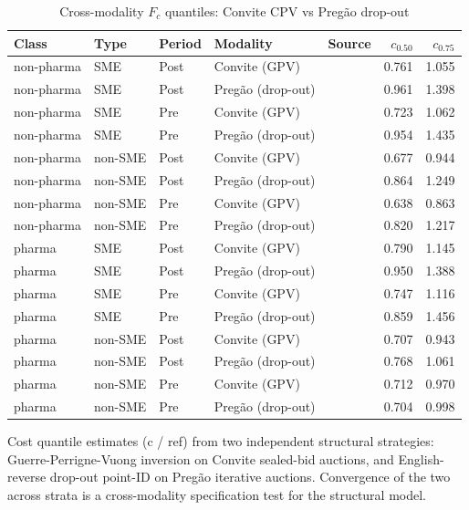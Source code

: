 \begin{table}[htbp]
\centering
\begin{threeparttable}
\caption{Cross-modality $F_c$ quantiles: Convite CPV vs Preg\~ao drop-out}
\label{tab:v3_cross_modality}
\small
\begin{tabular}{lllll rr}
\toprule
Class & Type & Period & Modality & Source & $c_{0.50}$ & $c_{0.75}$ \\
\midrule
non-pharma & SME & Post & Convite (GPV) & & 0.761 & 1.055 \\
non-pharma & SME & Post & Pregão (drop-out) & & 0.961 & 1.398 \\
non-pharma & SME & Pre & Convite (GPV) & & 0.723 & 1.062 \\
non-pharma & SME & Pre & Pregão (drop-out) & & 0.954 & 1.435 \\
non-pharma & non-SME & Post & Convite (GPV) & & 0.677 & 0.944 \\
non-pharma & non-SME & Post & Pregão (drop-out) & & 0.864 & 1.249 \\
non-pharma & non-SME & Pre & Convite (GPV) & & 0.638 & 0.863 \\
non-pharma & non-SME & Pre & Pregão (drop-out) & & 0.820 & 1.217 \\
pharma & SME & Post & Convite (GPV) & & 0.790 & 1.145 \\
pharma & SME & Post & Pregão (drop-out) & & 0.950 & 1.388 \\
pharma & SME & Pre & Convite (GPV) & & 0.747 & 1.116 \\
pharma & SME & Pre & Pregão (drop-out) & & 0.859 & 1.456 \\
pharma & non-SME & Post & Convite (GPV) & & 0.707 & 0.943 \\
pharma & non-SME & Post & Pregão (drop-out) & & 0.768 & 1.061 \\
pharma & non-SME & Pre & Convite (GPV) & & 0.712 & 0.970 \\
pharma & non-SME & Pre & Pregão (drop-out) & & 0.704 & 0.998 \\
\bottomrule
\end{tabular}
\begin{tablenotes}\footnotesize
\item Cost quantile estimates (c / ref) from two independent
structural strategies: Guerre-Perrigne-Vuong inversion on
Convite sealed-bid auctions, and English-reverse drop-out
point-ID on Preg\~ao iterative auctions. Convergence of the two
across strata is a cross-modality specification test for the
structural model.
\end{tablenotes}
\end{threeparttable}
\end{table}
